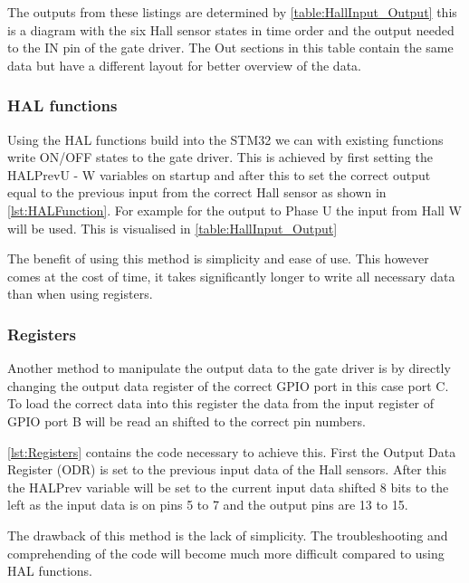 The outputs from these listings are determined by \autoref{table:HallInput_Output} this is a diagram with the six Hall sensor states in time order and the output needed to the IN pin of the gate driver. The Out sections in this table contain the same data but have a different layout for better overview of the data.
\subsubsection{HAL functions}
\label{subsubsection:HALFunctions}
Using the HAL functions build into the STM32 we can with existing functions write ON/OFF states to the gate driver. This is achieved by first setting the HALPrevU - W variables on startup and after this to set the correct output equal to the previous input from the correct Hall sensor as shown in \autoref{lst:HALFunction}. For example for the output to Phase U the input from Hall W will be used. This is visualised in \autoref{table:HallInput_Output}

The benefit of using this method is simplicity and ease of use. This however comes at the cost of time, it takes significantly longer to write all necessary data than when using registers.

\subsubsection{Registers}
\label{subsubsection:Registers}
Another method to manipulate the output data to the gate driver is by directly changing the output data register of the correct GPIO port in this case port C. To load the correct data into this register the data from the input register of GPIO port B will be read an shifted to the correct pin numbers.

\autoref{lst:Registers} contains the code necessary to achieve this. First the Output Data Register (ODR) is set to the previous input data of the Hall sensors. After this the HALPrev variable will be set to the current input data shifted 8 bits to the left as the input data is on pins 5 to 7 and the output pins are 13 to 15.

The drawback of this method is the lack of simplicity. The troubleshooting and comprehending of the code will become much more difficult compared to using HAL functions.

